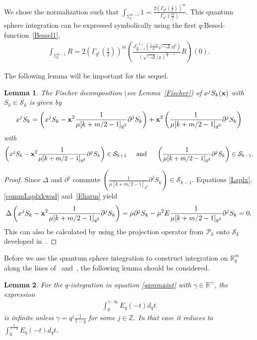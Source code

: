 \documentclass[11pt]{article}
\newtheorem{lemma}{Lemma}
\newcommand{\mR}{\mathbb{R}}
\newcommand{\mZ}{\mathbb{Z}}
\newcommand{\mS}{\mathbb{S}}
\newcommand{\cP}{\mathcal{P}}
\newcommand{\cS}{\mathcal{S}}
\numberwithin{equation}{section}
\begin{document}
We chose the normalization such that $\int_{\mS^{m-1}_q}1
=\frac{2\left(\Gamma_{q^2}(\frac{1}{2})\right)^{m}}{\Gamma_{q^2}(\frac{m}{2})}$.
This quantum sphere integration can be expressed symbolically using the f\/irst $q$-Bessel-function~\eqref{Bessel1},
\begin{gather}
\label{PizzBessel}
\int_{\mS^{m-1}_q}R = 2\left(\Gamma_{q^2}\left(\frac{1}{2}\right)\right)^{m}\left(\frac{J^{(1)}_{\frac{m}{2}-1}
\left(\frac{1+q}{\mu}\sqrt{-\Delta}|q^2\right)}{\left(\sqrt{-\Delta}/\mu\right)^{\frac{m}{2}-1}}R\right)(0).
\end{gather}

The following lemma will be important for the sequel.
\begin{lemma}\label{xS}
The Fischer decomposition $($see Lemma~{\rm \ref{Fischer})} of $x^jS_k(\bold{x})$ with $S_k\in\cS_k$ is given by
\begin{gather*}
x^jS_k=\left(x^jS_k-\bold{x}^2\frac{1}{\mu[k+m/2-1]_{q^2}}\partial^jS_k\right)+\bold{x}^2\left(\frac{1}{\mu[k+m/2-1]_{q^2}}\partial^jS_k\right)
\end{gather*}
with
\begin{gather*}
\left(x^jS_k-\bold{x}^2\frac{1}{\mu[k+m/2-1]_{q^2}}\partial^jS_k\right)\in\cS_{k+1} \!\!\!\qquad \mbox{and} \qquad\!\!\! \left(\frac{1}{\mu[k+m/2-1]_{q^2}}\partial^jS_k\right)\in\cS_{k-1}.
\end{gather*}
\end{lemma}
\begin{proof}\sloppy
Since $\Delta$ and $\partial^j$ commute $\left(\frac{1}{\mu[k+m/2-1]_{q^2}}\partial^jS_k\right)\in\cS_{k-1}$. Equations \eqref{Laplx}, \eqref{commLaplxkwad} and~\eqref{Eharm} yield
\begin{gather*}
\Delta\left(x^jS_k-\bold{x}^2\frac{1}{\mu[k+m/2-1]_{q^2}}\partial^jS_k\right)=
\mu\partial^jS_k-\mu^2E\frac{1}{\mu[k+m/2-1]_{q^2}}\partial^jS_k=0.
\end{gather*}
This can also be calculated by using the projection operator from $\cP_k$ onto $\cS_k$ developed \linebreak in~\cite{MR2006509}.
\end{proof}


Before we use the quantum sphere integration to construct integration on $\mR^m_q$ along the lines of~\cite{MR1303081} and~\cite{MR1239953}, the following lemma should be considered.
\begin{lemma}
\label{intexpinf}
For the $q$-integration in equation \eqref{gammaint} with $\gamma\in\mR^+$, the expression
\begin{gather*}
\int_0^{\gamma\cdot\infty}E_q(-t)d_qt
\end{gather*}
is infinite unless $\gamma=q^{j}\frac{1}{1-q}$ for some $j\in\mZ$. In that case it reduces to $\int_0^{\frac{1}{1-q}}E_q(-t)d_qt$.
\end{lemma}
\end{document}
